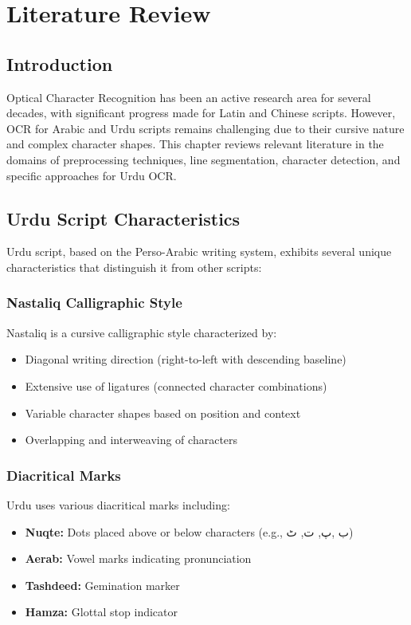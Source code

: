 \documentclass[12pt,a4paper,oneside]{report}
\begin{document}
\chapter{Literature Review}

\section{Introduction}

Optical Character Recognition has been an active research area for several decades, with significant progress made for Latin and Chinese scripts. However, OCR for Arabic and Urdu scripts remains challenging due to their cursive nature and complex character shapes. This chapter reviews relevant literature in the domains of preprocessing techniques, line segmentation, character detection, and specific approaches for Urdu OCR.

\section{Urdu Script Characteristics}

Urdu script, based on the Perso-Arabic writing system, exhibits several unique characteristics that distinguish it from other scripts:

\subsection{Nastaliq Calligraphic Style}
Nastaliq is a cursive calligraphic style characterized by:
\begin{itemize}
    \item Diagonal writing direction (right-to-left with descending baseline)
    \item Extensive use of ligatures (connected character combinations)
    \item Variable character shapes based on position and context
    \item Overlapping and interweaving of characters
\end{itemize}

\subsection{Diacritical Marks}
Urdu uses various diacritical marks including:
\begin{itemize}
    \item \textbf{Nuqte:} Dots placed above or below characters (e.g., ب ,پ, ت, ٹ)
    \item \textbf{Aerab:} Vowel marks indicating pronunciation
    \item \textbf{Tashdeed:} Gemination marker
    \item \textbf{Hamza:} Glottal stop indicator
\end{itemize}
\end{document}
